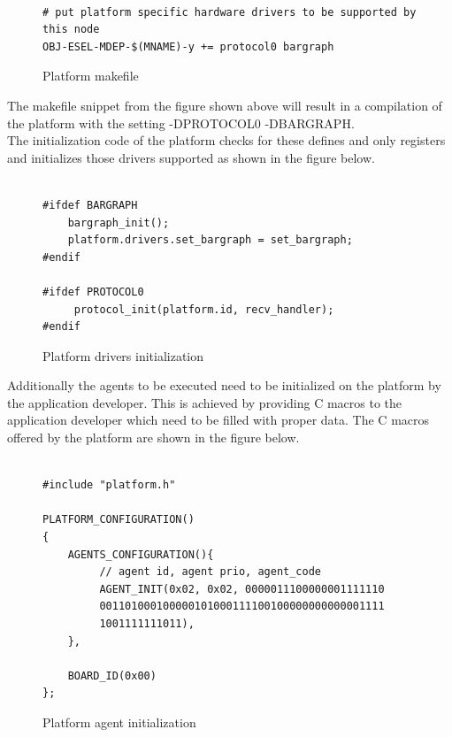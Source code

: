 \documentclass{scrreprt}
\begin{document}
\begin{figure}[!htb]
\begin{lstlisting}[frame=single]

# put platform specific hardware drivers to be supported by this node
OBJ-ESEL-MDEP-$(MNAME)-y += protocol0 bargraph

\end{lstlisting}
\caption{Platform makefile}
\label{fig:platform-makefile}
\end{figure}

\noindent
The makefile snippet from the figure shown above will result in a compilation of the 
platform with the setting -DPROTOCOL0 -DBARGRAPH.\\

\noindent
The initialization code of the platform checks for these defines and only registers and initializes those drivers supported as shown in
the figure below.

\begin{figure}[!htb]
\begin{lstlisting}[frame=single]

#ifdef BARGRAPH
	bargraph_init();
	platform.drivers.set_bargraph = set_bargraph;
#endif

#ifdef PROTOCOL0
	 protocol_init(platform.id, recv_handler);
#endif

\end{lstlisting}
\caption{Platform drivers initialization}
\label{fig:platform-init}
\end{figure}

\noindent
Additionally the agents to be executed need to be initialized on the platform by the application developer.
This is achieved by providing C macros to the application developer which need to be filled with proper data.
The C macros offered by the platform are shown in the figure below. \\

\begin{figure}[!htb]
\lstset{language=C, tabsize=2}
\begin{lstlisting}[frame=single]

#include "platform.h"

PLATFORM_CONFIGURATION()
{
	AGENTS_CONFIGURATION(){
		 // agent id, agent prio, agent_code
		 AGENT_INIT(0x02, 0x02, 0000011100000001111110
		 001101000100000101000111100100000000000001111
		 1001111111011),
	},
	
	BOARD_ID(0x00)
};

\end{lstlisting}
\caption{Platform agent initialization}
\label{fig:platform-agent-init}
\end{figure}
\end{document}
